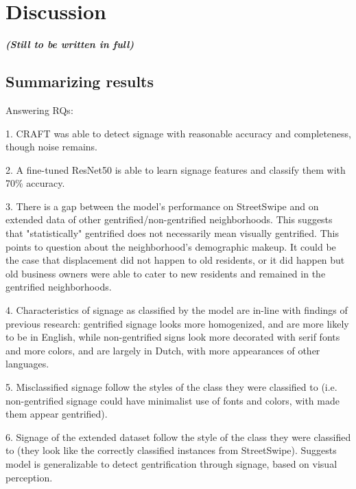 \section{Discussion}
\label{sec:discussion}

\textit{\textbf{(Still to be written in full)}}

\subsection{Summarizing results}
Answering RQs:

1. CRAFT was able to detect signage with reasonable accuracy and completeness, though noise remains.

2. A fine-tuned ResNet50 is able to learn signage features and classify them with 70\% accuracy.

3. There is a gap between the model's performance on StreetSwipe and on extended data of other gentrified/non-gentrified neighborhoods. This suggests that "statistically" gentrified does not necessarily mean visually gentrified. This points to question about the neighborhood's demographic makeup. It could be the case that displacement did not happen to old residents, or it did happen but old business owners were able to cater to new residents and remained in the gentrified neighborhoods.

4. Characteristics of signage as classified by the model are in-line with findings of previous research: gentrified signage looks more homogenized, and are more likely to be in English, while non-gentrified signs look more decorated with serif fonts and more colors, and are largely in Dutch, with more appearances of other languages.

5. Misclassified signage follow the styles of the class they were classified to (i.e. non-gentrified signage could have minimalist use of fonts and colors, with made them appear gentrified). 

6. Signage of the extended dataset follow the style of the class they were classified to (they look like the correctly classified instances from StreetSwipe). Suggests model is generalizable to detect gentrification through signage, based on visual perception.


